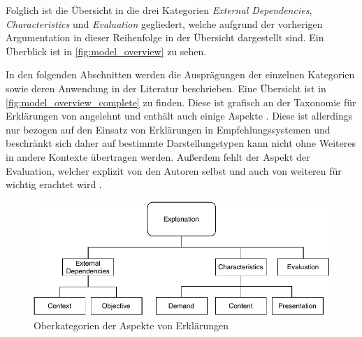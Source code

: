 \smallbreak

Folglich ist die Übersicht in die drei Kategorien \textit{External Dependencies}, \textit{Characteristics} und \textit{Evaluation} gegliedert, welche aufgrund der vorherigen Argumentation in dieser Reihenfolge in der Übersicht dargestellt sind. Ein Überblick ist in \autoref{fig:model_overview} zu sehen.

In den folgenden Abschnitten werden die Ausprägungen der einzelnen Kategorien sowie deren Anwendung in der Literatur beschrieben. Eine Übersicht ist in \autoref{fig:model_overview_complete} zu finden. Diese ist grafisch an der Taxonomie für Erklärungen von \citeauthor{nunes_systematic_2017} angelehnt und enthält auch einige Aspekte \cite{nunes_systematic_2017}. Diese ist allerdings nur bezogen auf den Einsatz von Erklärungen in Empfehlungssystemen und beschränkt sich daher auf bestimmte Darstellungstypen kann nicht ohne Weiteres in andere Kontexte übertragen werden. Außerdem fehlt der Aspekt der Evaluation, welcher explizit von den Autoren selbst und auch von weiteren für wichtig erachtet wird \cite{cirqueira_scenario-based_2020, martin_evaluating_2021}. 

\begin{figure}[htb!]
    \begin{center}
        \includegraphics[width=0.9\linewidth]{contents/05_model_description/res/model-overview.pdf}
    \end{center}
    \caption{Oberkategorien der Aspekte von Erklärungen}
    \label{fig:model_overview}
\end{figure}